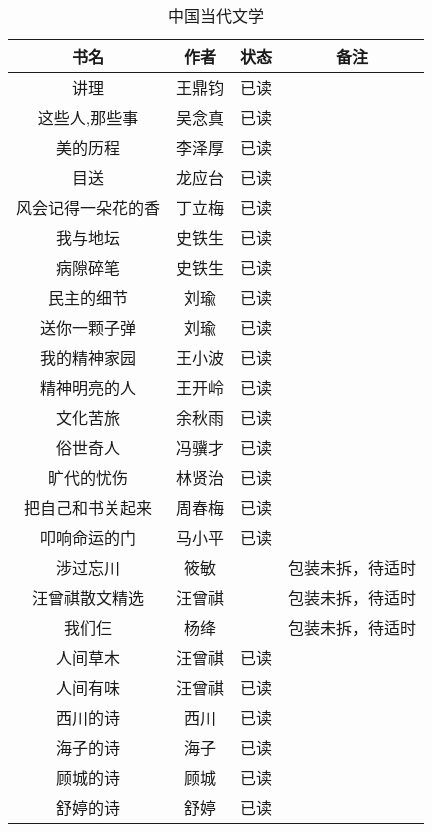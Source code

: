 \documentclass[UTF8,12pt]{ctexart}
\begin{document}
\begin{table}[h]
\centering
\begin{tabular}{cccc}
\toprule
书名&作者&状态&备注\\
\midrule
讲理&王鼎钧&已读\\
这些人,那些事&吴念真&已读\\
美的历程&李泽厚&已读\\
目送&龙应台&已读\\
风会记得一朵花的香&丁立梅&已读\\
我与地坛&史铁生&已读\\
病隙碎笔&史铁生&已读\\
民主的细节&刘瑜&已读\\
送你一颗子弹&刘瑜&已读\\
我的精神家园&王小波&已读\\
精神明亮的人&王开岭&已读\\
文化苦旅&余秋雨&已读\\
俗世奇人&冯骥才&已读\\
旷代的忧伤&林贤治&已读\\
把自己和书关起来&周春梅&已读\\
叩响命运的门&马小平&已读\\
涉过忘川&筱敏&&包装未拆，待适时\\
汪曾祺散文精选&汪曾祺&&包装未拆，待适时\\
我们仨&杨绛&&包装未拆，待适时\\
人间草木&汪曾祺&已读\\
人间有味&汪曾祺&已读\\
西川的诗&西川&已读\\
海子的诗&海子&已读\\
顾城的诗&顾城&已读\\
舒婷的诗&舒婷&已读\\
\bottomrule
\end{tabular}
\caption{中国当代文学}
\end{table}
\end{document}
